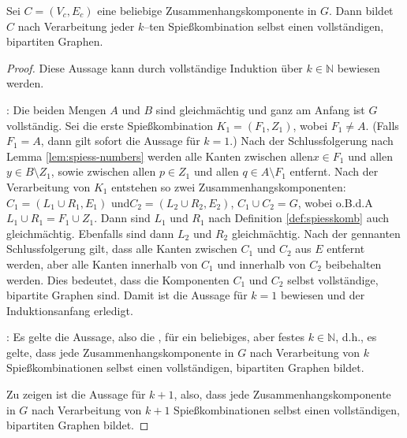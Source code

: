 \begin{lemma}\label{lem:komponente-complete}
Sei $C = (V_c, E_c)$ eine beliebige Zusammenhangskomponente in $G$. 
Dann bildet $C$ nach Verarbeitung jeder $k$--ten Spießkombination
selbst einen vollständigen, bipartiten Graphen.
\end{lemma}

\begin{proof}
Diese Aussage kann durch vollständige Induktion über $k \in \mathbb{N}$ bewiesen werden.

: 
Die beiden Mengen $A$ und $B$ sind gleichmächtig und ganz am Anfang ist $G$ vollständig.
Sei die erste Spießkombination $K_1 = (F_1, Z_1)$, wobei $F_1 \neq A$. (Falls $F_1 = A$,
dann gilt sofort die Aussage für $k = 1$.)
Nach der Schlussfolgerung nach Lemma \ref{lem:spiess-numbers} werden alle Kanten zwischen 
allen\break $x \in F_1$ und allen $y \in B \setminus Z_1$,
sowie zwischen allen $p \in Z_1$ und allen $q \in A \setminus F_1$ entfernt.
Nach der Verarbeitung von $K_1$ 
entstehen so zwei Zusammenhangskomponenten:
$C_1 = (L_1 \cup R_1, E_1)$ und\break $C_2 = (L_2 \cup R_2, E_2)$,
$C_1 \cup C_2 = G$, wobei o.B.d.A $L_1 \cup R_1 = F_1 \cup Z_1$.
Dann sind $L_1$ und $R_1$
nach Definition \ref{def:spiesskomb} auch gleichmächtig. 
Ebenfalls sind dann $L_2$ und $R_2$ gleichmächtig.
Nach der gennanten Schlussfolgerung gilt, dass alle Kanten zwischen $C_1$ und $C_2$
aus $E$ entfernt werden, aber alle Kanten innerhalb von $C_1$ und innerhalb von $C_2$
beibehalten werden.
Dies bedeutet, dass die Komponenten $C_1$ und $C_2$ selbst vollständige, bipartite Graphen sind.
Damit ist die Aussage für $k = 1$ bewiesen und der Induktionsanfang erledigt.

: Es gelte die Aussage, also die ,
für ein beliebiges, aber festes $k \in \mathbb{N}$, d.h., es gelte,
dass jede Zusammenhangskomponente in $G$ nach Verarbeitung von $k$ Spießkombinationen selbst
einen vollständigen, bipartiten Graphen bildet.

Zu zeigen ist die Aussage für $k + 1$, also, dass jede Zusammenhangskomponente in $G$ nach Verarbeitung
von $k + 1$ Spießkombinationen selbst einen vollständigen, bipartiten Graphen bildet.


\end{proof}
